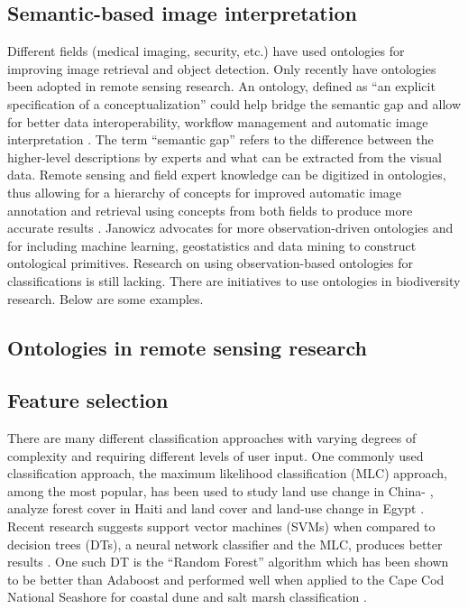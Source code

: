 \subsection{Semantic-based image interpretation}
Different fields (medical imaging, security, etc.) have used ontologies for
improving image retrieval and object detection. Only recently have ontologies
been adopted in remote sensing research. An ontology, defined as ``an explicit
specification of a conceptualization'' \citep{gruber1993} could help bridge the
semantic gap and allow for better data interoperability, workflow management and
automatic image interpretation \citep{Arvor2013} \citep{Andres2013a}. The term
``semantic gap'' refers to the difference between the higher-level descriptions
by experts and what can be extracted from the visual data. Remote sensing and
field expert knowledge can be digitized in ontologies, thus allowing for a
hierarchy of concepts for improved automatic image annotation and retrieval
using concepts from both fields to produce more accurate results
\citep{Srikanth:2005:EOA:1076034.1076128}. Janowicz \citep{Janowicz2012}
advocates for more observation-driven ontologies and for including machine
learning, geostatistics and data mining to construct ontological primitives.
Research on using observation-based ontologies for classifications is still
lacking. There are initiatives to use ontologies in biodiversity research. Below
are some examples.
\subsection{Ontologies in remote sensing research}

\subsection{Feature selection}
There are many different classification approaches with varying degrees of
complexity and requiring different levels of user input. One commonly used
classification approach, the maximum likelihood classification (MLC) approach,
among the most popular, has been used to study land use change in China-
\citep{Ding2007}, analyze forest cover in Haiti \citep{Churches2014} and land
cover and land-use change in Egypt \citep{Shalaby2007}. Recent research suggests
support vector machines (SVMs) when compared to decision trees (DTs), a neural
network classifier and the MLC, produces better results \citep{Huang2002}. One
such DT is the ``Random Forest'' algorithm which has been shown to be better
than Adaboost \citep{Chan2008} and performed well when applied to the Cape Cod
National Seashore for coastal dune and salt marsh classification
\citep{Timm2012}.
